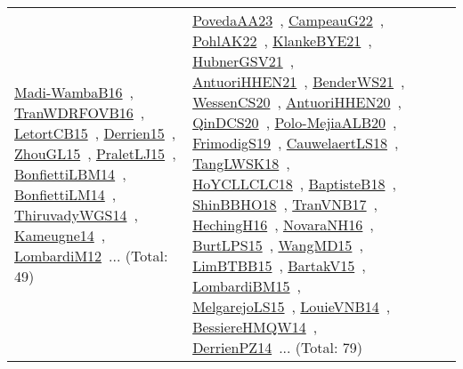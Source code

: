 {\begin{longtable}{lp{3cm}>{\raggedright\arraybackslash}p{6cm}>{\raggedright\arraybackslash}p{6cm}>{\raggedright\arraybackslash}p{8cm}}
\href{works/Madi-WambaB16.pdf}{Madi-WambaB16}~\cite{Madi-WambaB16}, \href{works/TranWDRFOVB16.pdf}{TranWDRFOVB16}~\cite{TranWDRFOVB16}, \href{works/LetortCB15.pdf}{LetortCB15}~\cite{LetortCB15}, \href{works/Derrien15.pdf}{Derrien15}~\cite{Derrien15}, \href{works/ZhouGL15.pdf}{ZhouGL15}~\cite{ZhouGL15}, \href{works/PraletLJ15.pdf}{PraletLJ15}~\cite{PraletLJ15}, \href{works/BonfiettiLBM14.pdf}{BonfiettiLBM14}~\cite{BonfiettiLBM14}, \href{works/BonfiettiLM14.pdf}{BonfiettiLM14}~\cite{BonfiettiLM14}, \href{works/ThiruvadyWGS14.pdf}{ThiruvadyWGS14}~\cite{ThiruvadyWGS14}, \href{works/Kameugne14.pdf}{Kameugne14}~\cite{Kameugne14}, \href{works/LombardiM12.pdf}{LombardiM12}~\cite{LombardiM12}... (Total: 49) & \href{works/PovedaAA23.pdf}{PovedaAA23}~\cite{PovedaAA23}, \href{works/CampeauG22.pdf}{CampeauG22}~\cite{CampeauG22}, \href{works/PohlAK22.pdf}{PohlAK22}~\cite{PohlAK22}, \href{works/KlankeBYE21.pdf}{KlankeBYE21}~\cite{KlankeBYE21}, \href{works/HubnerGSV21.pdf}{HubnerGSV21}~\cite{HubnerGSV21}, \href{works/AntuoriHHEN21.pdf}{AntuoriHHEN21}~\cite{AntuoriHHEN21}, \href{works/BenderWS21.pdf}{BenderWS21}~\cite{BenderWS21}, \href{works/WessenCS20.pdf}{WessenCS20}~\cite{WessenCS20}, \href{works/AntuoriHHEN20.pdf}{AntuoriHHEN20}~\cite{AntuoriHHEN20}, \href{works/QinDCS20.pdf}{QinDCS20}~\cite{QinDCS20}, \href{works/Polo-MejiaALB20.pdf}{Polo-MejiaALB20}~\cite{Polo-MejiaALB20}, \href{works/FrimodigS19.pdf}{FrimodigS19}~\cite{FrimodigS19}, \href{works/CauwelaertLS18.pdf}{CauwelaertLS18}~\cite{CauwelaertLS18}, \href{works/TangLWSK18.pdf}{TangLWSK18}~\cite{TangLWSK18}, \href{works/HoYCLLCLC18.pdf}{HoYCLLCLC18}~\cite{HoYCLLCLC18}, \href{works/BaptisteB18.pdf}{BaptisteB18}~\cite{BaptisteB18}, \href{works/ShinBBHO18.pdf}{ShinBBHO18}~\cite{ShinBBHO18}, \href{works/TranVNB17.pdf}{TranVNB17}~\cite{TranVNB17}, \href{works/HechingH16.pdf}{HechingH16}~\cite{HechingH16}, \href{works/NovaraNH16.pdf}{NovaraNH16}~\cite{NovaraNH16}, \href{works/BurtLPS15.pdf}{BurtLPS15}~\cite{BurtLPS15}, \href{works/WangMD15.pdf}{WangMD15}~\cite{WangMD15}, \href{works/LimBTBB15.pdf}{LimBTBB15}~\cite{LimBTBB15}, \href{works/BartakV15.pdf}{BartakV15}~\cite{BartakV15}, \href{works/LombardiBM15.pdf}{LombardiBM15}~\cite{LombardiBM15}, \href{works/MelgarejoLS15.pdf}{MelgarejoLS15}~\cite{MelgarejoLS15}, \href{works/LouieVNB14.pdf}{LouieVNB14}~\cite{LouieVNB14}, \href{works/BessiereHMQW14.pdf}{BessiereHMQW14}~\cite{BessiereHMQW14}, \href{works/DerrienPZ14.pdf}{DerrienPZ14}~\cite{DerrienPZ14}... (Total: 79)\\

\end{longtable}}
